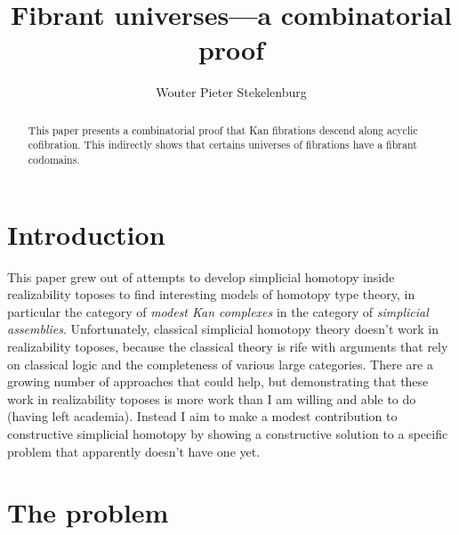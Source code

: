 \documentclass{tac}
\title{Fibrant universes---a combinatorial proof}
\author{Wouter Pieter Stekelenburg}
\newcommand\hide[1]{}
\begin{document}
\begin{abstract} This paper presents a combinatorial proof that Kan fibrations
  descend along acyclic cofibration. This indirectly shows that certains
  universes of fibrations have a fibrant codomains.
\end{abstract}

\maketitle

\section{Introduction}
This paper grew out of attempts to develop simplicial homotopy inside
realizability toposes to find interesting models of homotopy type theory, in
particular the category of \emph{modest Kan complexes} in the category of 
\emph{simplicial assemblies}.\hide{todo: refer to a point in the paper where 
these are explained}
Unfortunately, classical simplicial homotopy theory doesn't work in 
realizability toposes, because the classical theory is rife with arguments that 
rely on classical logic and the completeness of various large categories.
\hide{this could also do with explanation or citations} There are a growing 
number of approaches that could help,\hide{cite! Garner, Swan, Gambino, Henry, 
Stattler, Szumilo\dots} but demonstrating that these work in realizability 
toposes is more work than I am willing and able to do (having left academia). 
Instead I aim to make a modest contribution to constructive simplicial homotopy 
by showing a constructive solution to a specific problem that apparently doesn't
have one yet.

\section{The problem}
\end{document}
